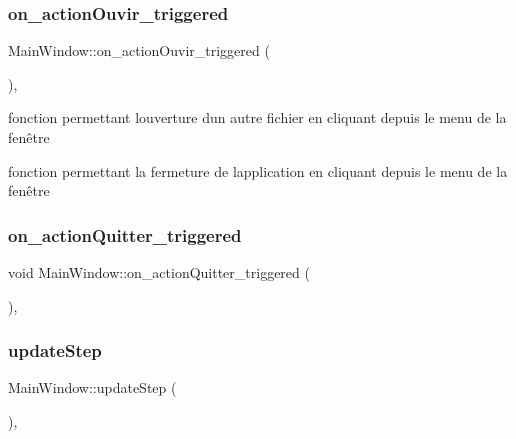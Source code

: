\subsubsection{\texorpdfstring{on\+\_\+action\+Ouvir\+\_\+triggered}{on\_actionOuvir\_triggered}}
{\footnotesize\ttfamily Main\+Window\+::on\+\_\+action\+Ouvir\+\_\+triggered (\begin{DoxyParamCaption}{ }\end{DoxyParamCaption})\hspace{0.3cm}{\ttfamily [private]}, {\ttfamily [slot]}}



fonction permettant l\textquotesingle{}ouverture d\textquotesingle{}un autre fichier en cliquant depuis le menu de la fenêtre 

fonction permettant la fermeture de l\textquotesingle{}application en cliquant depuis le menu de la fenêtre \mbox{\label{classMainWindow_afe9d9d46e61e2460e636619577a9e8fd}} 
\subsubsection{\texorpdfstring{on\+\_\+action\+Quitter\+\_\+triggered}{on\_actionQuitter\_triggered}}
{\footnotesize\ttfamily void Main\+Window\+::on\+\_\+action\+Quitter\+\_\+triggered (\begin{DoxyParamCaption}{ }\end{DoxyParamCaption})\hspace{0.3cm}{\ttfamily [private]}, {\ttfamily [slot]}}

\mbox{\label{classMainWindow_a344d21527850380c306fe7ac165321bd}} 
\subsubsection{\texorpdfstring{update\+Step}{updateStep}}
{\footnotesize\ttfamily Main\+Window\+::update\+Step (\begin{DoxyParamCaption}{ }\end{DoxyParamCaption})\hspace{0.3cm}{\ttfamily [private]}, {\ttfamily [slot]}}



